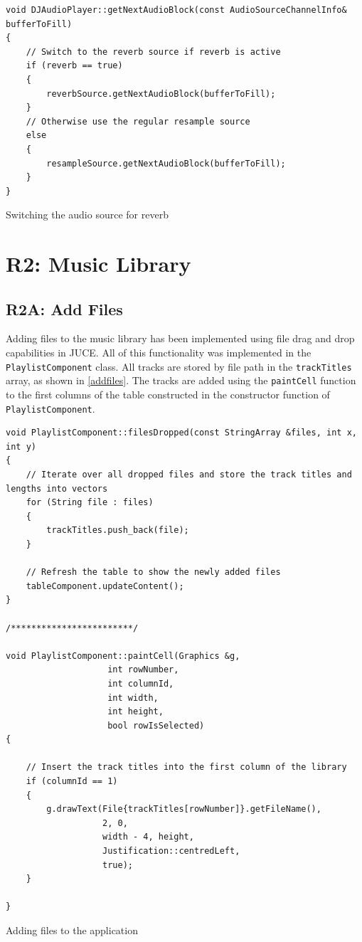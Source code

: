 \begin{listing}[H]
	\begin{verbatim}
void DJAudioPlayer::getNextAudioBlock(const AudioSourceChannelInfo& bufferToFill)
{
	// Switch to the reverb source if reverb is active
	if (reverb == true)
	{
		reverbSource.getNextAudioBlock(bufferToFill);
	}
	// Otherwise use the regular resample source
	else
	{
		resampleSource.getNextAudioBlock(bufferToFill);
	}
}
	\end{verbatim}
	\caption{Switching the audio source for reverb}
	\label{reverbsource}
\end{listing}

\section{R2: Music Library}
\subsection{R2A: Add Files}
Adding files to the music library has been implemented using file drag and drop capabilities in JUCE. All of this functionality was implemented in the \texttt{PlaylistComponent} class. All tracks are stored by file path in the \texttt{trackTitles} array, as shown in \autoref{addfiles}. The tracks are added using the \texttt{paintCell} function to the first columns of the table constructed in the constructor function of \texttt{PlaylistComponent}. 

\begin{listing}[H]
	\begin{verbatim}
void PlaylistComponent::filesDropped(const StringArray &files, int x, int y)
{
	// Iterate over all dropped files and store the track titles and lengths into vectors
	for (String file : files)
	{
		trackTitles.push_back(file); 
	}

	// Refresh the table to show the newly added files
	tableComponent.updateContent();
}

/************************/

void PlaylistComponent::paintCell(Graphics &g,
					int rowNumber,
					int columnId,
					int width,
					int height,
					bool rowIsSelected)
{

	// Insert the track titles into the first column of the library
	if (columnId == 1)
	{
		g.drawText(File{trackTitles[rowNumber]}.getFileName(),
				   2, 0,
				   width - 4, height,
				   Justification::centredLeft,
				   true);
	}

}

	\end{verbatim}
	\caption{Adding files to the application}
	\label{addfiles}
\end{listing}


